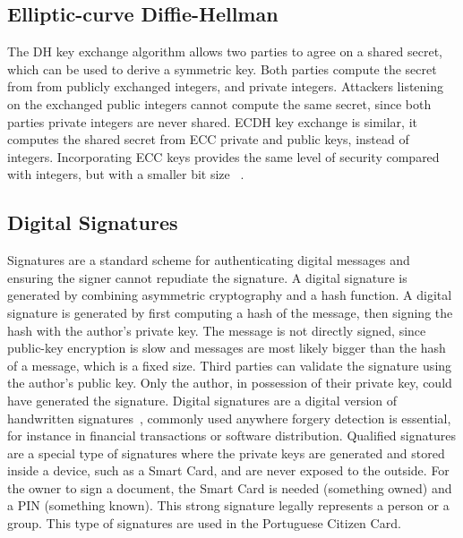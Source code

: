 \subsection{Elliptic-curve Diffie-Hellman}\label{chap:background:crypto:ecdh}

The \ac{DH} key exchange algorithm allows two parties to agree on a shared secret, which can be used to derive a symmetric key. Both parties compute the secret from from publicly exchanged integers, and private integers. Attackers listening on the exchanged public integers cannot compute the same secret, since both parties private integers are never shared.
\ac{ECDH} key exchange is similar, it computes the shared secret from \ac{ECC} private and public keys, instead of integers. Incorporating \ac{ECC} keys provides the same level of security compared with integers, but with a smaller bit size ~\cite{fiskiran2002workload}.

\subsection{Digital Signatures}\label{chap:background:crypto:signatures}

Signatures are a standard scheme for authenticating digital messages and ensuring the signer cannot repudiate the signature. A digital signature is generated by combining asymmetric cryptography and a hash function.
A digital signature is generated by first computing a hash of the message, then signing the hash with the author's private key. The message is not directly signed, since public-key encryption is slow and messages are most likely bigger than the hash of a message, which is a fixed size. Third parties can validate the signature using the author's public key. Only the author, in possession of their private key, could have generated the signature.
Digital signatures are a digital version of handwritten signatures~\cite{digitalsignatures}, commonly used anywhere forgery detection is essential, for instance in financial transactions or software distribution.
Qualified signatures are a special type of signatures where the private keys are generated and stored inside a device, such as a Smart Card, and are never exposed to the outside. For the owner to sign a document, the Smart Card is needed (something owned) and a \ac{PIN} (something known). This strong signature legally represents a person or a group. This type of signatures are used in the Portuguese Citizen Card.

